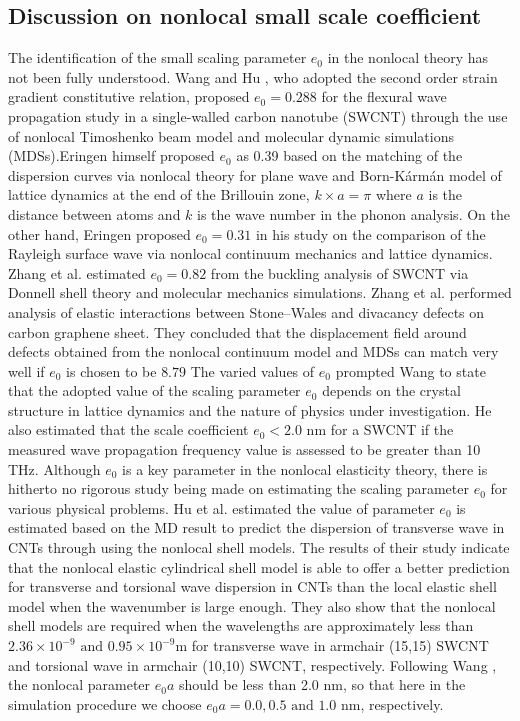\subsection{Discussion on nonlocal small scale coefficient}
The identification of the small scaling parameter $e_0$ in the
nonlocal theory has not been fully understood. Wang and Hu \cite{wang2005flexural},
who adopted the second order strain gradient constitutive relation,
proposed $e_0 = 0.288$ for the flexural wave propagation study in a
single-walled carbon nanotube (SWCNT) through the use of
nonlocal Timoshenko beam model and molecular dynamic simulations (MDSs).Eringen \cite{eringen1983differential} himself proposed $e_0$ as 0.39 based on the
matching of the dispersion curves via nonlocal theory for plane wave and Born-K\'arm\'an model of lattice dynamics at the end of
the Brillouin zone, $k \times a = \pi$ where $a$ is the distance between atoms
and $k$ is the wave number in the phonon analysis. On the other
hand, Eringen \cite{eringen1972linear}proposed $e_0 =0.31$ in his study on the comparison of the Rayleigh surface wave via nonlocal continuum mechanics
and lattice dynamics. Zhang et al.\cite{zhang2005free} estimated $e_0=0.82$ from the buckling analysis of SWCNT via Donnell shell theory and molecular
mechanics simulations. Zhang et al.\cite{zhang2006atomistic} performed analysis of
elastic interactions between Stone–Wales and divacancy defects on
carbon graphene sheet. They concluded that the displacement field
around defects obtained from the nonlocal continuum model and
MDSs can match very well if $e_0$ is chosen to be $8.79$  The varied
values of $e_0$ prompted Wang \cite{wang2005wave} to state that the adopted value of
the scaling parameter $e_0$ depends on the crystal structure in lattice
dynamics and the nature of physics under investigation. He also
estimated that the scale coefficient $e_0 < 2.0$ nm for a SWCNT if the
measured wave propagation frequency value is assessed to be
greater than 10 THz. Although $e_0$ is a key parameter in the nonlocal
elasticity theory, there is hitherto no rigorous study being made on
estimating the scaling parameter $e_0$ for various physical problems.
Hu et al.\cite{hu2008nonlocal} estimated the value of parameter $e_0$ is estimated
based on the MD result to predict the dispersion of transverse wave
in CNTs through using the nonlocal shell models. The results of
their study indicate that the nonlocal elastic cylindrical shell model
is able to offer a better prediction for transverse and torsional wave
dispersion in CNTs than the local elastic shell model when the
wavenumber is large enough. They also show that the nonlocal
shell models are required when the wavelengths are approximately
less than $2.36 \times 10^{-9} \text{ and } 0.95 \times  10^{-9}$m for transverse wave in armchair (15,15) SWCNT and torsional wave in armchair (10,10)
SWCNT, respectively. Following Wang \cite{wang2005wave}, the nonlocal parameter $e_0a$ should be less than 2.0 nm, so that here in the simulation procedure we choose
$e_0a = 0.0, 0.5\text{ and }1.0 $ nm, respectively.

